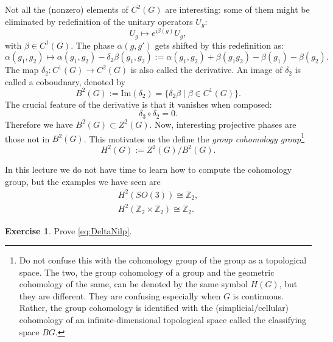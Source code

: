 \documentclass[
]{scrartcl}
\numberwithin{equation}{section}
\theoremstyle{definition}
\theoremstyle{definition}
\theoremstyle{definition}
\newtheorem{exercise}{Exercise}[section]
\theoremstyle{definition}
\theoremstyle{remark}
\begin{document}
Not all the (nonzero) elements of \(C^2(G)\) are interesting: some of them might be eliminated by
redefinition of the unitary operators \(U_g\):
\begin{equation}
  \label{eq:UredefGen}
  U_g \mapsto e^{\mathrm{i}\beta(g)}U_g,
\end{equation}
with \(\beta \in C^1(G)\).
The phase \(\alpha(g,g')\) gets shifted by this redefinition as:
\begin{equation}
  \label{eq:ProjPhaseGauge}
  \alpha(g_1,g_2) \mapsto \alpha(g_1,g_2) - \delta_2 \beta (g_1,g_2) := \alpha(g_1,g_2) + \beta(g_1g_2)-\beta(g_1) - \beta(g_2).
\end{equation}
The map \(\delta_2: C^1(G) \to C^2(G)\) is also called the derivative.
An image of \(\delta_2\) is called a coboudnary, denoted by
\begin{equation}
  \label{eq:GroupCoboundary}
  B^2(G) := \mathrm{Im}(\delta_2) = \{\delta_2 \beta\mid \beta \in C^1(G)\}.
\end{equation}
The crucial feature of the derivative is that it vanishes when composed:
\begin{equation}
  \label{eq:DeltaNilp}
  \delta_3\circ \delta_2 = 0.
\end{equation}
Therefore we have \(B^2(G)\subset Z^2(G)\).
Now, interesting projective phases are those not in \(B^2(G)\).
This motivates us the define the \emph{group cohomology group}\footnote{Do not confuse this with the cohomology group of the group as a topological space. The two, the group cohomology of a group and the geometric cohomology of the same, can be denoted by the same symbol \(H(G)\), but they are different. They are confusing especially when \(G\) is continuous.
  Rather, the group cohomology is identified with the (simplicial/cellular) cohomology of an infinite-dimensional topological space called the classifying space \(BG\).}
\begin{equation}
  \label{eq:GroupCohomology}
  H^2(G) := Z^2(G)/B^2(G).
\end{equation}

In this lecture we do not have time to learn how to compute the cohomology group, but the examples we have seen are
\begin{gather}
  \label{eq:CohomologySO3Z2Z2}
  H^2(SO(3)) \cong \mathbb{Z}_2,\\
  H^2(\mathbb{Z}_2\times\mathbb{Z}_2) \cong \mathbb{Z}_2.
\end{gather}

\begin{exercise}
Prove \eqref{eq:DeltaNilp}.
\end{exercise}
\end{document}
